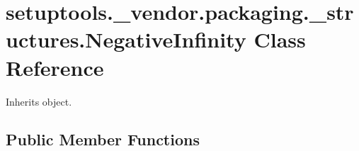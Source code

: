 \hypertarget{classsetuptools_1_1__vendor_1_1packaging_1_1__structures_1_1_negative_infinity}{}\section{setuptools.\+\_\+vendor.\+packaging.\+\_\+structures.\+Negative\+Infinity Class Reference}
\label{classsetuptools_1_1__vendor_1_1packaging_1_1__structures_1_1_negative_infinity}


Inherits object.

\subsection*{Public Member Functions}
